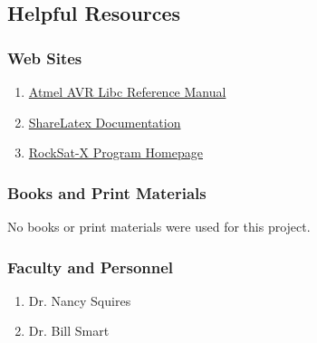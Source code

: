 \subsection{Helpful Resources}
\subsubsection{Web Sites}
\begin{enumerate}
\item{\href{http://www.atmel.com/webdoc/avrlibcreferencemanual/}{Atmel AVR Libc Reference Manual}}
\item{\href{https://www.sharelatex.com/learn/}{ShareLatex Documentation}}
\item{\href{http://phobos.colorado.edu/national-programs/rs-x-2017-home}{RockSat-X Program Homepage}}
\end{enumerate}

\subsubsection{Books and Print Materials}
No books or print materials were used for this project.

\subsubsection{Faculty and Personnel}
\begin{enumerate}
\item{Dr. Nancy Squires}
\item{Dr. Bill Smart}
\end{enumerate}
